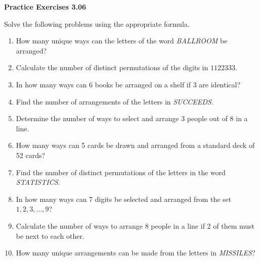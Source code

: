 \vspace{0.3ex}
\noindent\textbf{Practice Exercises 3.06}

\vspace{0.2ex}

Solve the following problems using the appropriate formula.

\begin{enumerate}[label=\color{blue}\arabic*.]
    \item How many unique ways can the letters of the word \textit{BALLROOM} be arranged?
    \item Calculate the number of distinct permutations of the digits in \(1122333\).
    \item In how many ways can 6 books be arranged on a shelf if 3 are identical?
    \item Find the number of arrangements of the letters in \textit{SUCCEEDS}.
    \item Determine the number of ways to select and arrange 3 people out of 8 in a line.
    \item How many ways can 5 cards be drawn and arranged from a standard deck of 52 cards?
    \item Find the number of distinct permutations of the letters in the word \textit{STATISTICS}.
    \item In how many ways can 7 digits be selected and arranged from the set \(1, 2, 3, \ldots, 9\)?
    \item Calculate the number of ways to arrange 8 people in a line if 2 of them must be next to each other.
    \item How many unique arrangements can be made from the letters in \textit{MISSILES}?
\end{enumerate}
